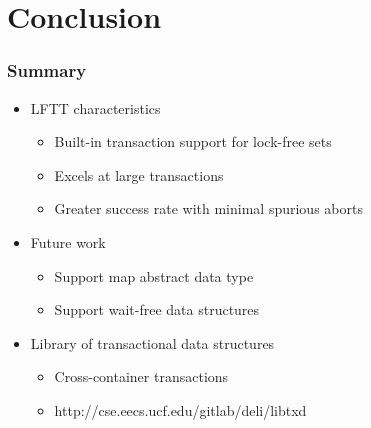 \documentclass{beamer}
\begin{document}
\section{Conclusion}
\begin{frame} \frametitle{Summary}
    \begin{itemize}
        \item LFTT characteristics
            \begin{itemize}
                \item Built-in transaction support for lock-free sets
                \item Excels at large transactions
                \item Greater success rate with minimal spurious aborts
            \end{itemize}
        \item Future work
            \begin{itemize}
                \item Support map abstract data type
                \item Support wait-free data structures
            \end{itemize}
        \item Library of transactional data structures
            \begin{itemize}
                \item Cross-container transactions
                \item http://cse.eecs.ucf.edu/gitlab/deli/libtxd
            \end{itemize}
    \end{itemize}
\end{frame}

\end{document}
